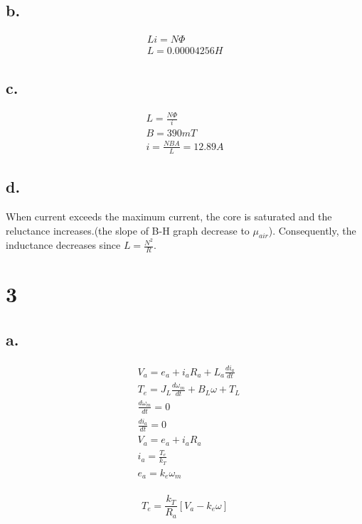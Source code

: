 \documentclass{article}
\begin{document}
    \subsection*{b.}
    \begin{align*}
        Li = N \Phi\\
        L = 0.00004256H
    \end{align*}
    
    \subsection*{c.}
    \begin{align*}
        L = \frac{N \Phi}{i}\\
        B = 390 mT\\
        i = \frac{NBA}{L} = 12.89A
    \end{align*}
    
    \subsection*{d.}
    When current exceeds the maximum current, the core is saturated and 
    the reluctance increases.(the slope of B-H graph decrease to $\mu_{air}$). 
    Consequently, the inductance decreases since $L = \frac{N^{2}}{R}$.
        
    \section*{3}
    \subsection*{a.}
    \begin{align*}
        &V_{a} = e_{a}  + i_{a}R_{a} + L_{a}\frac{di_{a}}{dt}\\
        &T_{e} = J_{L} \frac{d\omega_{m}}{dt} + B_{L}\omega + T_{L}\\
        &\frac{d\omega_{m}}{dt} = 0\\
        &\frac{di_a}{dt} = 0\\
        &V_{a} = e_{a} + i_{a}R_{a}\\
        &i_{a} = \frac{T_{e}}{k_{T}}\\
        &e_{a} = k_{e}\omega_{m}\\
    \end{align*}

    \begin{equation*}
        \boxed{T_{e} = \frac{k_{T}}{R_{a}}[V_{a} - k_{e}\omega]}
    \end{equation*}
\end{document}
